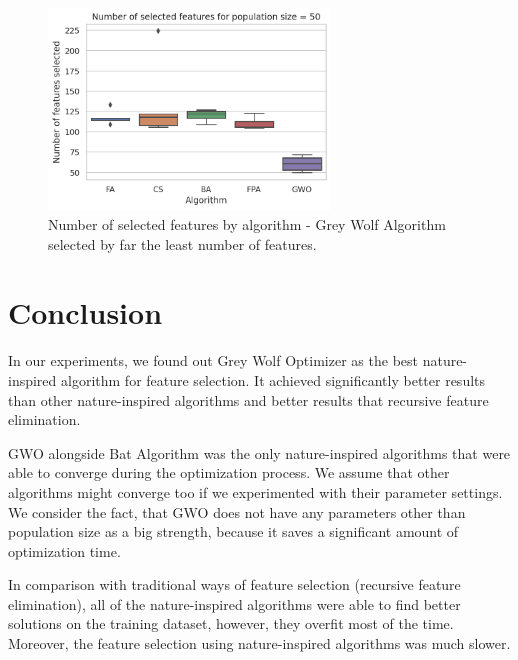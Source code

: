 \documentclass[runningheads]{llncs}
\begin{document}
\begin{figure}[ht]
	\begin{center}
	    \includegraphics[width=7.5cm]{figures/nia_selected_features_by_algorithm.png}
    \end{center}
	\caption{Number of selected features by algorithm - Grey Wolf Algorithm selected by far the least number of features.}
	\label{fig:nia_selected_features_by_algorithm}
\end{figure}

\section{Conclusion}

In our experiments, we found out Grey Wolf Optimizer as the best nature-inspired algorithm for feature selection. It achieved significantly better results than other nature-inspired algorithms and better results that recursive feature elimination.

GWO alongside Bat Algorithm was the only nature-inspired algorithms that were able to converge during the optimization process. We assume that other algorithms might converge too if we experimented with their parameter settings. We consider the fact, that GWO does not have any parameters other than population size as a big strength, because it saves a significant amount of optimization time.

In comparison with traditional ways of feature selection (recursive feature elimination), all of the nature-inspired algorithms were able to find better solutions on the training dataset, however, they overfit most of the time. Moreover, the feature selection using nature-inspired algorithms was much slower.




\end{document}
